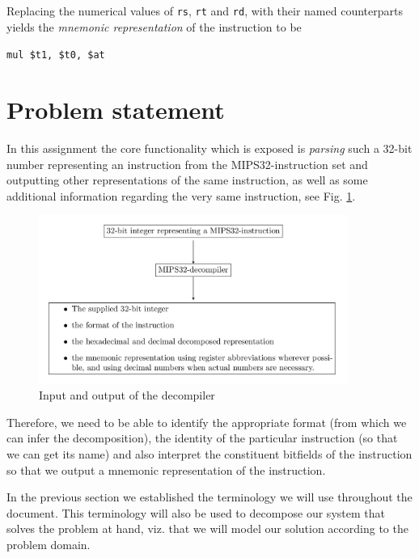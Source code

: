 \documentclass[a4paper]{article}
\begin{document}
Replacing the numerical values of \texttt{rs}, \texttt{rt} and
\texttt{rd}, with their named counterparts yields the \emph{mnemonic
representation} of the instruction to be

\begin{center}
  \texttt{mul \$t1, \$t0, \$at}
\end{center}

\section{Problem statement}\label{section:problem-statement}

In this assignment the core functionality which is exposed is
\emph{parsing} such a 32-bit number representing an instruction from
the MIPS32-instruction set and outputting other representations of the
same instruction, as well as some additional information regarding the
very same instruction, see Fig. \ref{fig:mips32-decompiler}.

\begin{figure}[H]
  \centering
  \includegraphics[width=0.9\textwidth]{figures/mips32-decompiler.png}
  \caption{Input and output of the decompiler}
  \label{fig:mips32-decompiler}
\end{figure}

Therefore, we need to be able to identify the appropriate format (from
which we can infer the decomposition), the identity of the particular
instruction (so that we can get its name) and also interpret the
constituent bitfields of the instruction so that we output a mnemonic
representation of the instruction.

In the previous section we established the terminology we will use
throughout the document. This terminology will also be used to
decompose our system that solves the problem at hand, viz. that
we will model our solution according to the problem domain.
\end{document}
